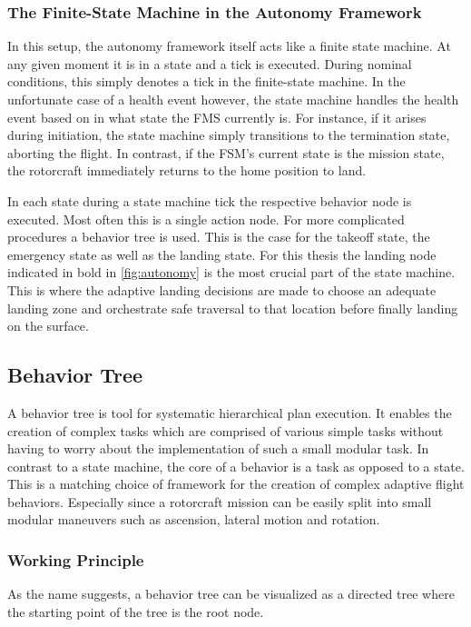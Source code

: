 \subsubsection{The Finite-State Machine in the Autonomy Framework}

In this setup, the autonomy framework itself acts like a finite state machine. At any given moment it is in a state and a tick is executed. During nominal conditions, this simply denotes a tick in the finite-state machine. In the unfortunate case of a health event however, the state machine handles the health event based on in what state the FMS currently is. For instance, if it arises during initiation, the state machine simply transitions to the termination state, aborting the flight. In contrast, if the FSM's current state is the mission state, the rotorcraft immediately returns to the home position to land.

In each state during a state machine tick the respective behavior node is executed. Most often this is a single action node. For more complicated procedures a behavior tree is used. This is the case for the takeoff state, the emergency state as well as the landing state. For this thesis the landing node indicated in bold in \cref{fig:autonomy} is the most crucial part of the state machine. This is where the adaptive landing decisions are made to choose an adequate landing zone and orchestrate safe traversal to that location before finally landing on the surface.

\subsection{Behavior Tree}\label{subsec:setup:behavior_tree}

A behavior tree is tool for systematic hierarchical plan execution. It enables the creation of complex tasks which are comprised of various simple tasks without having to worry about the implementation of such a small modular task. In contrast to a state machine, the core of a behavior is a task as opposed to a state. This is a matching choice of framework for the creation of complex adaptive flight behaviors. Especially since a rotorcraft mission can be easily split into small modular maneuvers such as ascension, lateral motion and rotation.

\subsubsection{Working Principle}
As the name suggests, a behavior tree can be visualized as a directed tree where the starting point of the tree is the root node. 

